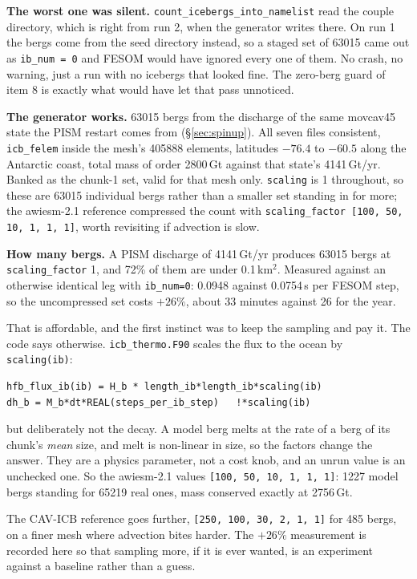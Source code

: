 \documentclass[11pt,a4paper]{article}
\newcommand{\code}[1]{\texttt{\small #1}}
\begin{document}
\medskip\noindent
\textbf{The worst one was silent.} \code{count\_icebergs\_into\_namelist} read the couple
directory, which is right from run 2, when the generator writes there. On run 1 the bergs come
from the seed directory instead, so a staged set of 63015 came out as \code{ib\_num = 0} and FESOM
would have ignored every one of them. No crash, no warning, just a run with no icebergs that
looked fine. The zero-berg guard of item 8 is exactly what would have let that pass unnoticed.

\medskip\noindent
\textbf{The generator works.} 63015 bergs from the discharge of the same movcav45 state the PISM
restart comes from (\S\ref{sec:spinup}). All seven files consistent, \code{icb\_felem} inside the
mesh's 405888 elements, latitudes $-76.4$ to $-60.5$ along the Antarctic coast, total mass of
order 2800\,Gt against that state's 4141\,Gt/yr. Banked as the chunk-1 set, valid for that mesh
only. \code{scaling} is 1 throughout, so these are 63015 individual bergs rather than a smaller
set standing in for more; the awiesm-2.1 reference compressed the count with
\code{scaling\_factor [100, 50, 10, 1, 1, 1]}, worth revisiting if advection is slow.

\medskip\noindent
\textbf{How many bergs.} A PISM discharge of 4141\,Gt/yr produces 63015 bergs at
\code{scaling\_factor} 1, and 72\% of them are under 0.1\,km$^2$. Measured against an otherwise
identical leg with \code{ib\_num=0}: 0.0948 against 0.0754\,s per FESOM step, so the uncompressed
set costs $+26\%$, about 33 minutes against 26 for the year.

That is affordable, and the first instinct was to keep the sampling and pay it. The code says
otherwise. \code{icb\_thermo.F90} scales the flux to the ocean by \code{scaling(ib)}:

\begin{verbatim}
hfb_flux_ib(ib) = H_b * length_ib*length_ib*scaling(ib)
dh_b = M_b*dt*REAL(steps_per_ib_step)   !*scaling(ib)
\end{verbatim}

\noindent
but deliberately not the decay. A model berg melts at the rate of a berg of its chunk's
\emph{mean} size, and melt is non-linear in size, so the factors change the answer. They are a
physics parameter, not a cost knob, and an unrun value is an unchecked one. So the awiesm-2.1
values \code{[100, 50, 10, 1, 1, 1]}: 1227 model bergs standing for 65219 real ones, mass
conserved exactly at 2756\,Gt.

The CAV-ICB reference goes further, \code{[250, 100, 30, 2, 1, 1]} for 485 bergs, on a finer mesh
where advection bites harder. The $+26\%$ measurement is recorded here so that sampling more, if it
is ever wanted, is an experiment against a baseline rather than a guess.
\end{document}
